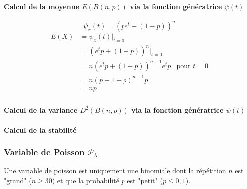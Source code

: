 \paragraph{Calcul de la moyenne $E(B(n,p))$ via la fonction génératrice $\psi(t)$}
$$\boxed{\psi_x(t) = (pe^t+(1-p))^n}$$
\begin{align*}
E(X) &= \psi_x(t)|_{t=0}\\
     &= ( e^tp + (1-p))^n|_{t=0}\\
     &= n ( e^tp + (1-p) )^{n-1}e^tp&\text{pour } t=0\\
     &= n ( p + 1 - p )^{n-1} p\\
     &= np\\
\end{align*}

\paragraph{Calcul de la variance $D^2(B(n,p))$ via la fonction génératrice $\psi(t)$}


\paragraph{Calcul de la stabilité}



\newpage
\subsubsection{Variable de Poisson $\mathcal{P}_\lambda$}
Une variable de poisson est uniquement une binomiale dont la répétition $n$ est "grand" ($n\geq30$) et que la probabilité $p$ est "petit" ($p\leq0,1$).

